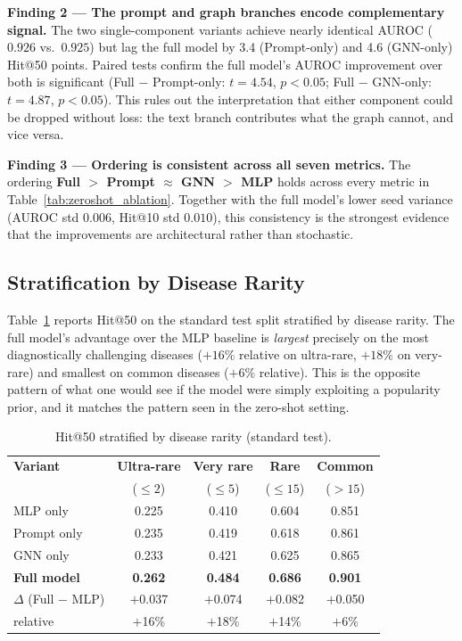 \documentclass[conference]{IEEEtran}
\begin{document}
\textbf{Finding 2 --- The prompt and graph branches encode complementary signal.}
The two single-component variants achieve nearly identical AUROC ($0.926$ vs.\ $0.925$) but lag the full model by 3.4 (Prompt-only) and 4.6 (GNN-only) Hit@50 points. Paired tests confirm the full model's AUROC improvement over both is significant (Full $-$ Prompt-only: $t\!=\!4.54$, $p\!<\!0.05$; Full $-$ GNN-only: $t\!=\!4.87$, $p\!<\!0.05$). This rules out the interpretation that either component could be dropped without loss: the text branch contributes what the graph cannot, and vice versa.

\textbf{Finding 3 --- Ordering is consistent across all seven metrics.}
The ordering \textbf{Full $>$ Prompt $\approx$ GNN $>$ MLP} holds across every metric in Table~\ref{tab:zeroshot_ablation}. Together with the full model's lower seed variance (AUROC std $0.006$, Hit@10 std $0.010$), this consistency is the strongest evidence that the improvements are architectural rather than stochastic.

\subsection{Stratification by Disease Rarity}
Table~\ref{tab:stratified} reports Hit@50 on the standard test split stratified by disease rarity. The full model's advantage over the MLP baseline is \emph{largest} precisely on the most diagnostically challenging diseases ($+16\%$ relative on ultra-rare, $+18\%$ on very-rare) and smallest on common diseases ($+6\%$ relative). This is the opposite pattern of what one would see if the model were simply exploiting a popularity prior, and it matches the pattern seen in the zero-shot setting.

\begin{table}[t]
\centering
\caption{Hit@50 stratified by disease rarity (standard test).}
\label{tab:stratified}
\small
\begin{tabular}{@{}lcccc@{}}
\toprule
\textbf{Variant} & \textbf{Ultra-rare} & \textbf{Very rare} & \textbf{Rare} & \textbf{Common} \\
                 & ($\leq\!\!2$) & ($\leq\!\!5$) & ($\leq\!\!15$) & ($>\!\!15$) \\
\midrule
MLP only    & 0.225 & 0.410 & 0.604 & 0.851 \\
Prompt only & 0.235 & 0.419 & 0.618 & 0.861 \\
GNN only    & 0.233 & 0.421 & 0.625 & 0.865 \\
\textbf{Full model} & \textbf{0.262} & \textbf{0.484} & \textbf{0.686} & \textbf{0.901} \\
\midrule
$\Delta$ (Full $-$ MLP) & $+$0.037 & $+$0.074 & $+$0.082 & $+$0.050 \\
\quad relative          & $+$16\% & $+$18\% & $+$14\% & $+$6\% \\
\bottomrule
\end{tabular}
\end{table}
\end{document}
